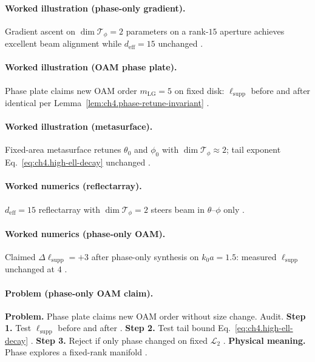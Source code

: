 \paragraph{Worked illustration (phase-only gradient).}
Gradient ascent on \(\dim\mathcal{T}_{\phi}=2\) parameters on a rank-\(15\) aperture achieves excellent beam alignment while \(d_{\mathrm{eff}}=15\) unchanged
\cite{harrington2001,devaney2004,stratton1941,hansen1988}.

\paragraph{Worked illustration (OAM phase plate).}
Phase plate claims new OAM order \(m_{\mathrm{LG}}=5\) on fixed disk: \(\ell_{\mathrm{supp}}\) before and after identical per
Lemma~\ref{lem:ch4.phase-retune-invariant} \cite{hansen1988,harrington2001,jackson1999}.

\paragraph{Worked illustration (metasurface).}
Fixed-area metasurface retunes \(\theta_{0}\) and \(\phi_{0}\) with \(\dim\mathcal{T}_{\phi}\approx2\); tail exponent Eq.~\eqref{eq:ch4.high-ell-decay}
unchanged \cite{stratton1941,collin2001,devaney2004}.

\paragraph{Worked numerics (reflectarray).}
\(d_{\mathrm{eff}}=15\) reflectarray with \(\dim\mathcal{T}_{\phi}=2\) steers beam in \(\theta\)--\(\phi\) only \cite{hansen1988,collin2001,harrington2001}.

\paragraph{Worked numerics (phase-only OAM).}
Claimed \(\Delta\ell_{\mathrm{supp}}=+3\) after phase-only synthesis on \(k_{0}a=1.5\): measured \(\ell_{\mathrm{supp}}\) unchanged at \(4\)
\cite{hansen1988,jackson1999,stratton1941,devaney2004}.

\paragraph{Problem (phase-only OAM claim).}
\textbf{Problem.} Phase plate claims new OAM order without size change. Audit.
\textbf{Step 1.} Test \(\ell_{\mathrm{supp}}\) before and after \cite{hansen1988,stratton1941}.
\textbf{Step 2.} Test tail bound Eq.~\eqref{eq:ch4.high-ell-decay} \cite{jackson1999,devaney2004}.
\textbf{Step 3.} Reject if only phase changed on fixed \(\mathcal{L}_{2}\) \cite{harrington2001}.
\textbf{Physical meaning.} Phase explores a fixed-rank manifold \cite{stratton1941}.

